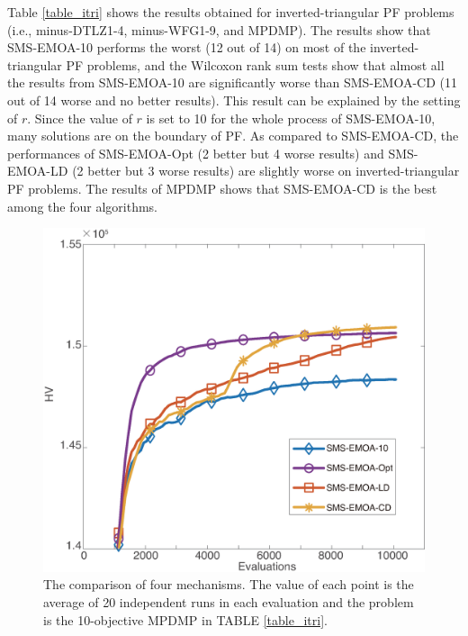 \documentclass[conference]{IEEEtran}
\begin{document}
Table \ref{table_itri} shows the results obtained for inverted-triangular PF problems 
(i.e., minus-DTLZ1-4, minus-WFG1-9, and MPDMP). 
The results show that SMS-EMOA-10 performs the worst (12 out of 14) on most of the inverted-triangular PF problems, 
and the Wilcoxon rank sum tests show that almost all the results from SMS-EMOA-10 are significantly worse than SMS-EMOA-CD 
(11 out of 14 worse and no better results). 
This result can be explained by the setting of $r$. Since the value of $r$ is set to 10 for the whole process of SMS-EMOA-10, many solutions are on the boundary of PF. 
As compared to SMS-EMOA-CD, the performances of SMS-EMOA-Opt (2 better but 4 worse results) and SMS-EMOA-LD (2 better but 3 worse results) are slightly worse on inverted-triangular PF problems. 
The results of MPDMP shows that SMS-EMOA-CD is the best among the four algorithms. 

\begin{figure}[!t]
  \centering
    \includegraphics[width=\columnwidth]{SMSEMOA_MPDMP_hv_2}
  \caption{The comparison of four mechanisms. %
  The value of each point is the average of 20 independent runs in each evaluation
  and the problem is the 10-objective MPDMP in TABLE \ref{table_itri}. 
  }
  \label{crdmp}
\end{figure}
\end{document}
